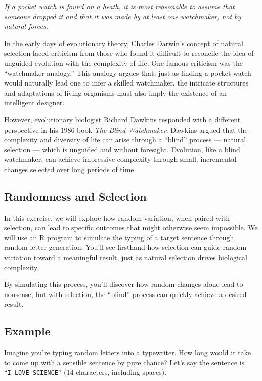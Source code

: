 \documentclass[
  a4paper]{book}
\begin{document}
\emph{If a pocket watch is found on a heath, it is most reasonable to assume that someone dropped it and that it was made by at least one watchmaker, not by natural forces.}

In the early days of evolutionary theory, Charles Darwin's concept of natural selection faced criticism from those who found it difficult to reconcile the idea of unguided evolution with the complexity of life. One famous criticism was the ``watchmaker analogy.'' This analogy argues that, just as finding a pocket watch would naturally lead one to infer a skilled watchmaker, the intricate structures and adaptations of living organisms must also imply the existence of an intelligent designer.

However, evolutionary biologist Richard Dawkins responded with a different perspective in his 1986 book \emph{The Blind Watchmaker}. Dawkins argued that the complexity and diversity of life can arise through a ``blind'' process --- natural selection --- which is unguided and without foresight. Evolution, like a blind watchmaker, can achieve impressive complexity through small, incremental changes selected over long periods of time.

\subsection{Randomness and Selection}\label{randomness-and-selection}

In this exercise, we will explore how random variation, when paired with selection, can lead to specific outcomes that might otherwise seem impossible. We will use an R program to simulate the typing of a target sentence through random letter generation. You'll see firsthand how selection can guide random variation toward a meaningful result, just as natural selection drives biological complexity.

By simulating this process, you'll discover how random changes alone lead to nonsense, but with selection, the ``blind'' process can quickly achieve a desired result.

\subsection{Example}\label{example}

Imagine you're typing random letters into a typewriter. How long would it take to come up with a sensible sentence by pure chance? Let's say the sentence is ``\texttt{I\ LOVE\ SCIENCE}'' (14 characters, including spaces).
\end{document}
